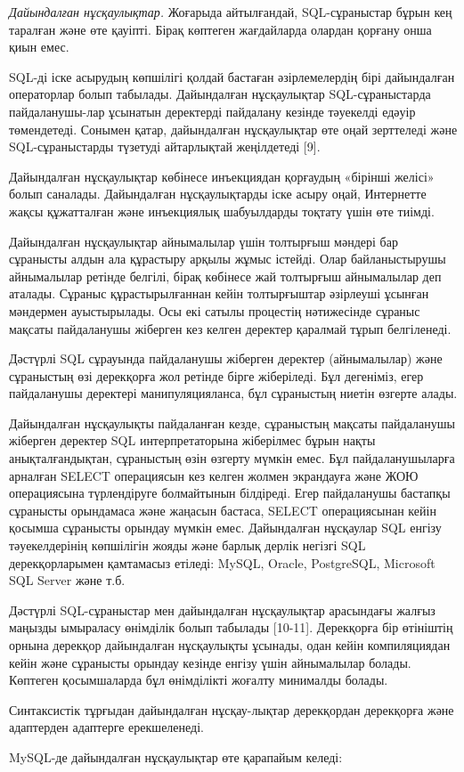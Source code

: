 \begin{multicols}{2}

\emph{Дайындалған нұсқаулықтар.} Жоғарыда айтылғандай, SQL-сұраныстар
бұрын кең таралған және өте қауіпті. Бірақ көптеген жағдайларда олардан
қорғану онша қиын емес.

SQL-ді іске асырудың көпшілігі қолдай бастаған әзірлемелердің бірі
дайындалған операторлар болып табылады. Дайындалған нұсқаулықтар
SQL-сұраныстарда пайдаланушы-лар ұсынатын деректерді пайдалану кезінде
тәуекелді едәуір төмендетеді. Сонымен қатар, дайындалған нұсқаулықтар
өте оңай зерттеледі және SQL-сұраныстарды түзетуді айтарлықтай
жеңілдетеді {[}9{]}.

Дайындалған нұсқаулықтар көбінесе инъекциядан қорғаудың «бірінші желісі»
болып саналады. Дайындалған нұсқаулықтарды іске асыру оңай, Интернетте
жақсы құжатталған және инъекциялық шабуылдарды тоқтату үшін өте тиімді.

Дайындалған нұсқаулықтар айнымалылар үшін толтырғыш мәндері бар
сұранысты алдын ала құрастыру арқылы жұмыс істейді. Олар байланыстырушы
айнымалылар ретінде белгілі, бірақ көбінесе жай толтырғыш айнымалылар
деп аталады. Сұраныс құрастырылғаннан кейін толтырғыштар әзірлеуші
ұсынған мәндермен ауыстырылады. Осы екі сатылы процестің нәтижесінде
сұраныс мақсаты пайдаланушы жіберген кез келген деректер қаралмай тұрып
белгіленеді.

Дәстүрлі SQL сұрауында пайдаланушы жіберген деректер (айнымалылар) және
сұраныстың өзі дерекқорға жол ретінде бірге жіберіледі. Бұл дегеніміз,
егер пайдаланушы деректері манипуляцияланса, бұл сұраныстың ниетін
өзгерте алады.

Дайындалған нұсқаулықты пайдаланған кезде, сұраныстың мақсаты
пайдаланушы жіберген деректер SQL интерпретаторына жіберілмес бұрын
нақты анықталғандықтан, сұраныстың өзін өзгерту мүмкін емес. Бұл
пайдаланушыларға арналған SELECT операциясын кез келген жолмен
экрандауға және ЖОЮ операциясына түрлендіруге болмайтынын білдіреді.
Егер пайдаланушы бастапқы сұранысты орындамаса және жаңасын бастаса,
SELECT операциясынан кейін қосымша сұранысты орындау мүмкін емес.
Дайындалған нұсқаулар SQL енгізу тәуекелдерінің көпшілігін жояды және
барлық дерлік негізгі SQL дерекқорларымен қамтамасыз етіледі: MySQL,
Oracle, PostgreSQL, Microsoft SQL Server және т.б.

Дәстүрлі SQL-сұраныстар мен дайындалған нұсқаулықтар арасындағы жалғыз
маңызды ымыраласу өнімділік болып табылады {[}10-11{]}. Дерекқорға бір
өтініштің орнына дерекқор дайындалған нұсқаулықты ұсынады, одан кейін
компиляциядан кейін және сұранысты орындау кезінде енгізу үшін
айнымалылар болады. Көптеген қосымшаларда бұл өнімділікті жоғалту
минималды болады.

Синтаксистік тұрғыдан дайындалған нұсқау-лықтар дерекқордан дерекқорға
және адаптерден адаптерге ерекшеленеді.

MySQL-де дайындалған нұсқаулықтар өте қарапайым келеді:
\end{multicols}
